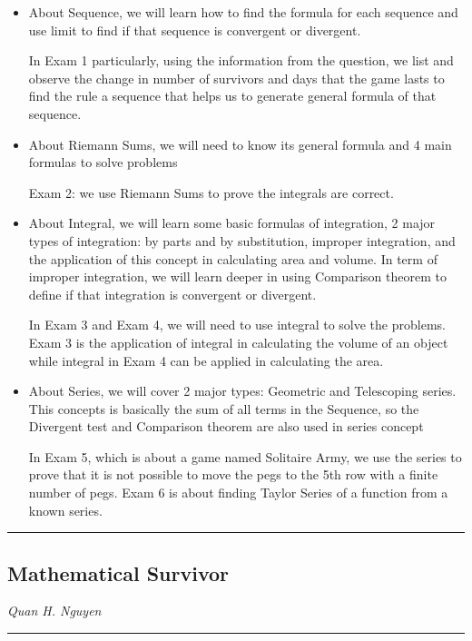 \documentclass[12pt]{article}
\begin{document}
\begin{itemize}
    \item About Sequence, we will learn how to find the formula for each sequence and use limit to find if that sequence is convergent or divergent.
    
    In Exam 1 particularly, using the information from the question, we list and observe the change in number of survivors and days that the game lasts to find the rule a sequence that helps us to generate general formula of that sequence.

    \item About Riemann Sums, we will need to know its general formula and 4 main formulas to solve problems
    
    Exam 2: we use Riemann Sums to prove the integrals are correct.

    \item About Integral, we will learn some basic formulas of integration, 2 major types of integration: by parts and by substitution, improper integration, and the application of this concept in calculating area and volume. In term of improper integration, we will learn deeper in using Comparison theorem to define if that integration is convergent or divergent.
    
    In Exam 3 and Exam 4, we will need to use integral to solve the problems. Exam 3 is the application of integral in calculating the volume of an object while integral in Exam 4 can be applied in calculating the area.

    \item About Series, we will cover 2 major types: Geometric and Telescoping series. This concepts is basically the sum of all terms in the Sequence, so the Divergent test and Comparison theorem are also used in series concept

    In Exam 5, which is about a game named Solitaire Army, we use the series to prove that it is not possible to move the pegs to the 5th row with a finite number of pegs. Exam 6 is about finding Taylor Series of a function from a known series.

\end{itemize}



\newpage

\hrule
\vspace{.2mm}
\begin{center}
    \section*{Mathematical Survivor}
    \textit{Quan H. Nguyen}
\end{center}
\vspace{.2mm}
\hrule
\end{document}
